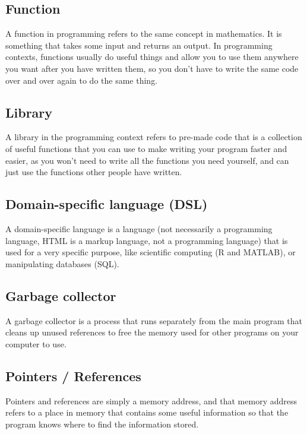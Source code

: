 \documentclass[11pt]{article}
\begin{document}
\subsection{Function}
\label{sec:org0c1d2ba}
A function in programming refers to the same
concept in mathematics. It is something
that takes some input and returns an output.
In programming contexts, functions usually
do useful things and allow you to use
them anywhere you want after you have
written them, so you don't have to write
the same code over and over again to do
the same thing.

 \newpage

\subsection{Library}
\label{sec:org789d0e9}
A library in the programming context refers to
pre-made code that is a collection of
useful functions that you can use to make
writing your program faster and easier,
as you won't need to write all the functions
you need yourself, and can just use the
functions other people have written.

\subsection{Domain-specific language (DSL)}
\label{sec:org826fce1}
A domain-specific language is a language
(not necessarily a programming language,
HTML is a markup language,
not a programming language) that is used
for a very specific purpose, like scientific
computing (R and MATLAB),
or manipulating databases (SQL).

\subsection{Garbage collector}
\label{sec:org096bea1}
A garbage collector is a process that runs separately
from the main program that cleans up unused references
to free the memory used for other programs on
your computer to use.

\subsection{Pointers / References}
\label{sec:orgd14daf4}
Pointers and references are
simply a memory address,
and that memory address refers to a
place in memory that contains some useful
information so that the program knows
where to find the information stored.

 \newpage
\end{document}
